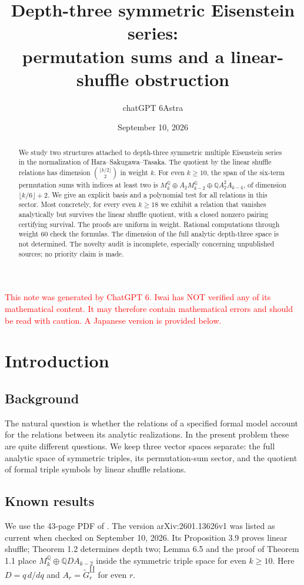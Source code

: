 \documentclass[12pt]{amsart}
\title[Symmetric triples and shuffle obstructions]{Depth-three symmetric Eisenstein series:\\
permutation sums and a linear-shuffle obstruction}
\author{chatGPT 6Astra}
\date{September 10, 2026}
\theoremstyle{definition}
\theoremstyle{remark}
\numberwithin{equation}{section}
\newcommand{\Q}{\mathbb{Q}}
\newcommand{\xr}[1]{\textcolor{red}{#1}}
\newcommand{\sh}{\mathbin{\amalg}}
\numberwithin{equation}{section}
\begin{document}
\renewcommand{\thesection}{E.\arabic{section}}
\renewcommand{\theHsection}{E.\arabic{section}}
\begin{abstract}
We study two structures attached to depth-three symmetric multiple Eisenstein
series in the normalization of Hara--Sakugawa--Tasaka. The quotient by the
linear shuffle relations has dimension $\binom{\lfloor k/2\rfloor}{2}$ in
weight $k$. For even $k\ge10$, the span of the six-term permutation sums with
indices at least two is
$M_k^{\Q}\oplus A_2M_{k-2}^{\Q}\oplus\Q A_2^2A_{k-4}$, of dimension
$\lfloor k/6\rfloor+2$. We give an explicit basis and a polynomial test for
all relations in this sector. Most concretely, for every even $k\ge18$ we
exhibit a relation that vanishes analytically but survives the linear shuffle
quotient, with a closed nonzero pairing certifying survival. The proofs are
uniform in weight. Rational computations through weight 60 check the formulas.
The dimension of the full analytic depth-three space is not determined.
The novelty audit is incomplete, especially concerning unpublished sources;
no priority claim is made.
\end{abstract}
\maketitle
{}
\setcounter{tocdepth}{1}
\tableofcontents

\xr{This note was generated by ChatGPT 6. Iwai has NOT verified any of its mathematical content. It may therefore contain mathematical errors and should be read with caution. A Japanese version is provided below.}

\section{Introduction}
\subsection{Background}
The natural question is whether the relations of a specified formal model
account for the relations between its analytic realizations. In the present
problem these are quite different questions. We keep three vector spaces
separate: the full analytic space of symmetric triples, its permutation-sum
sector, and the quotient of formal triple symbols by linear shuffle relations.

\subsection{Known results}
We use the 43-page PDF of \cite{hst}.
The version arXiv:\allowbreak2601.13626v1 was listed as current when checked
on September 10, 2026.
Its Proposition 3.9 proves linear shuffle; Theorem 1.2 determines depth two;
Lemma 6.5 and the proof of Theorem 1.1 place
$M_k^{\Q}\oplus\Q D A_{k-2}$ inside the symmetric triple space for even
$k\ge10$. Here $D=q\,d/dq$ and $A_r=\widetilde G_r^{\sh}$ for even $r$.
\end{document}
